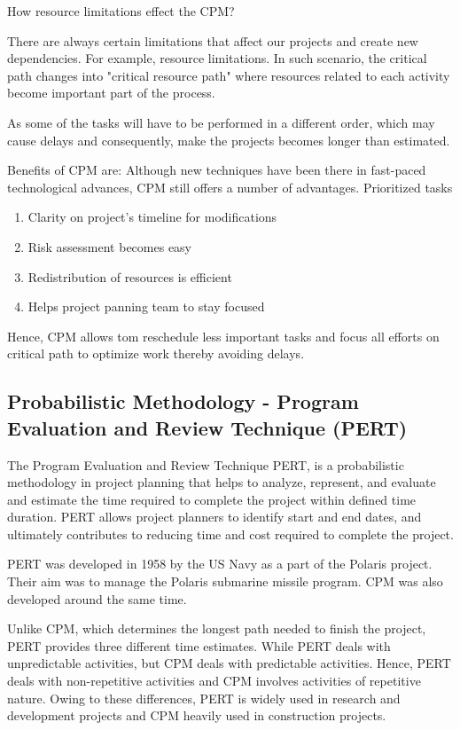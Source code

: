 How resource limitations effect the CPM?

There are always certain limitations that affect our projects and create new dependencies. For example, resource limitations. In such scenario, the critical path changes into "critical resource path" where resources related to each activity become important part of the process.

As some of the tasks will have to be performed in a different order, which may cause delays and consequently, make the projects becomes longer than estimated.


Benefits of CPM are:
Although new techniques have been there in fast-paced technological advances, CPM still offers a number of advantages.
Prioritized tasks 
\begin{enumerate}
	\item Clarity on project’s timeline for modifications 
	\item Risk assessment becomes easy 
	\item Redistribution of resources is efficient 
	\item Helps project panning team to stay focused

\end{enumerate}

Hence, CPM allows tom reschedule less important tasks and focus all efforts on critical path to optimize work thereby avoiding delays.

\subsection{Probabilistic   Methodology - Program Evaluation and Review Technique (PERT)}

The Program Evaluation and Review Technique PERT, is a probabilistic methodology in project planning that helps to analyze, represent, and evaluate and estimate the time required to complete the project within defined time duration. PERT allows project planners to identify start and end dates, and ultimately contributes to reducing time and cost required to complete the project.

PERT was developed in 1958 by the US Navy as a part of the Polaris project. Their aim was to manage the Polaris submarine missile program. CPM was also developed around the same time.

Unlike CPM, which determines the longest path needed to finish the project, PERT provides three different time estimates. While PERT deals with unpredictable activities, but CPM deals with predictable activities. Hence, PERT deals with non-repetitive activities and CPM involves activities of repetitive nature. Owing to these differences, PERT is widely used in research and development projects and CPM heavily used in construction projects.

